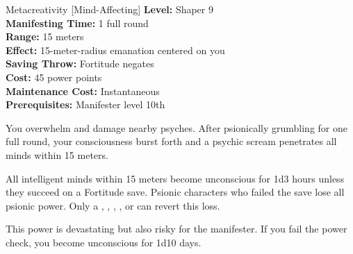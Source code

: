 {Metacreativity [Mind-Affecting]}
{
    \textbf{Level:}
    Shaper 9\\
    \textbf{Manifesting Time:}
    1 full round\\
    \textbf{Range:}
    15 meters\\
    \textbf{Effect:}
    15-meter-radius emanation centered on you\\
    \textbf{Saving Throw:}
    Fortitude negates\\
    \textbf{Cost:}
    45 power points\\
    \textbf{Maintenance Cost:}
    Instantaneous\\
    \textbf{Prerequisites:}
    Manifester level 10th\\
}
{
    You overwhelm and damage nearby psyches. After psionically grumbling for one full round, your consciousness burst forth and a psychic scream penetrates all minds within 15 meters.

    All intelligent minds within 15 meters become unconscious for 1d3 hours unless they succeed on a Fortitude save. Psionic characters who failed the save lose all psionic power. Only a , , , , or  can revert this loss.

    This power is devastating but also risky for the manifester. If you fail the power check, you become unconscious for 1d10 days.
}
